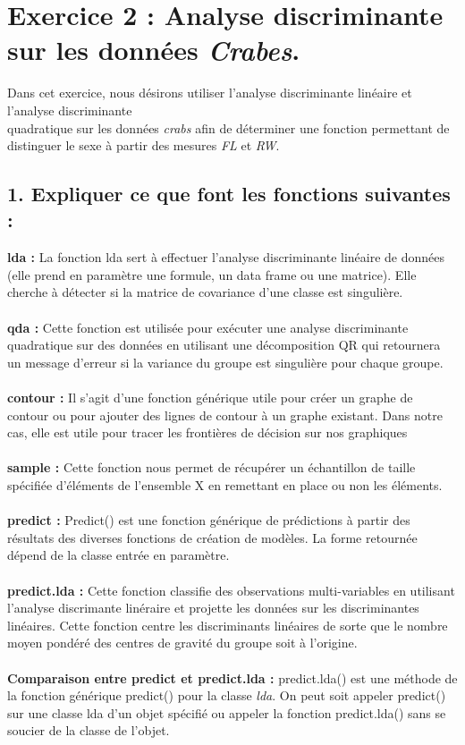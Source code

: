 \documentclass[a4paper, 10pt]{article}
\begin{document}
\section*{Exercice 2 : Analyse discriminante sur les données \textit{Crabes}.}
Dans cet exercice, nous désirons utiliser l'analyse discriminante linéaire et l'analyse discriminante\\quadratique sur les données \textit{crabs}
afin de déterminer une fonction permettant de distinguer le sexe à partir des mesures \textit{FL} et \textit{RW}.\\

\subsection*{1. Expliquer ce que font les fonctions suivantes :}
\textbf{lda :} La fonction lda sert à effectuer l'analyse discriminante linéaire de données
(elle prend en paramètre une formule, un data frame ou une matrice).
Elle cherche à détecter si la matrice de covariance d'une classe est singulière.\\ \\
\textbf{qda :} Cette fonction est utilisée pour exécuter une analyse discriminante quadratique sur des données
en utilisant une décomposition QR qui retournera un message d'erreur si la variance du groupe est singulière pour chaque groupe.\\ \\
\textbf{contour :} Il s'agit d'une fonction générique utile pour créer un graphe de contour ou
pour ajouter des lignes de contour à un graphe existant.
Dans notre cas, elle est utile pour tracer les frontières de décision sur nos graphiques\\ \\
\textbf{sample :} Cette fonction nous permet de récupérer un échantillon de taille spécifiée d'éléments de l'ensemble X
en remettant en place ou non les éléments.\\ \\
\textbf{predict :} Predict() est une fonction générique de prédictions à partir des résultats des diverses fonctions de création de modèles.
La forme retournée dépend de la classe entrée en paramètre.\\ \\
\textbf{predict.lda :} Cette fonction classifie des observations multi-variables en utilisant l'analyse discrimante linéraire et
projette les données sur les discriminantes linéaires.
Cette fonction centre les discriminants linéaires de sorte que le nombre moyen pondéré des centres de gravité du groupe soit à l'origine.\\ \\
\textbf{Comparaison entre predict et predict.lda :} predict.lda() est une méthode de la fonction générique predict() pour la classe \textit{lda}.
On peut soit appeler predict() sur une classe lda d'un objet spécifié ou
appeler la fonction predict.lda() sans se soucier de la classe de l'objet.
\end{document}
